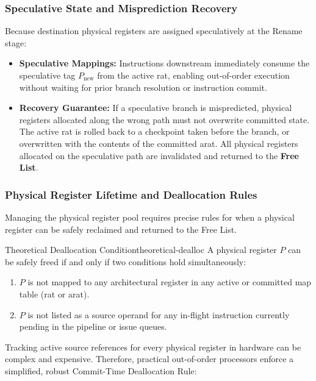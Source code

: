 \subsubsection{Speculative State and Misprediction Recovery}
Because destination physical registers are assigned speculatively at the Rename stage:
\begin{itemize}
    \item \textbf{Speculative Mappings:} Instructions downstream immediately consume the speculative tag $P_{\text{new}}$ from the active \gls{rat}, enabling out-of-order execution without waiting for prior branch resolution or instruction commit.
    \item \textbf{Recovery Guarantee:} If a speculative branch is mispredicted, physical registers allocated along the wrong path must not overwrite committed state. The active \gls{rat} is rolled back to a checkpoint taken before the branch, or overwritten with the contents of the committed \gls{arat}. All physical registers allocated on the speculative path are invalidated and returned to the \textbf{Free List}.
\end{itemize}

\subsubsection{Physical Register Lifetime and Deallocation Rules}
Managing the physical register pool requires precise rules for when a physical register can be safely reclaimed and returned to the Free List.

\begin{theorem}{Theoretical Deallocation Condition}{theoretical-dealloc}
A physical register $P$ can be safely freed if and only if two conditions hold simultaneously:
\begin{enumerate}
    \item $P$ is not mapped to any architectural register in any active or committed map table (\gls{rat} or \gls{arat}).
    \item $P$ is not listed as a source operand for any in-flight instruction currently pending in the pipeline or issue queues.
\end{enumerate}
\end{theorem}

Tracking active source references for every physical register in hardware can be complex and expensive. Therefore, practical out-of-order processors enforce a simplified, robust Commit-Time Deallocation Rule:

